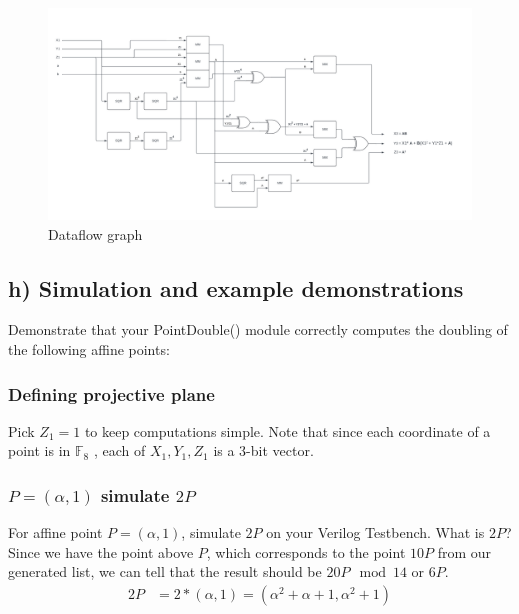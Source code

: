 \documentclass[a4paper,11pt]{exam}
\begin{document}
\begin{center}
\begin{figure}[!h]
    \centering
    \includegraphics[width=19.5cm]{./images/DATA_FLOW_GRAPH_projective.pdf}
    \caption{Dataflow graph}
    \label{fig:dfg}
  \end{figure}
\end{center}



\subsection{h) Simulation and example demonstrations}
\label{sec:orgda2d3da}
 Demonstrate that your PointDouble() module correctly computes the doubling of the
following affine points:

\subsubsection{Defining projective plane}
\label{sec:org7542375}
Pick \(Z_1 = 1\) to keep computations simple. Note that since each coordinate of a point is
in \(\mathbb{F}_8\) , each of \(X_1, Y_1, Z_1\) is a 3-bit vector.

\subsubsection{\(P = (\alpha, 1)\) simulate \(2P\)}
\label{sec:org5ad3f8e}
For affine point \(P = (\alpha, 1)\), simulate \(2P\) on your Verilog Testbench. What is \(2P\)?\\
\noindent
Since we have the point above \(P\), which corresponds to the point \(10P\) from our generated list, we can tell that the result should be \(20P \mod{14}\) or \(6P\).
\begin{align*}
 2P &= 2*(\alpha, 1) = (\alpha^2 + \alpha + 1, \alpha^2 + 1)\\
\end{align*}
\end{document}
